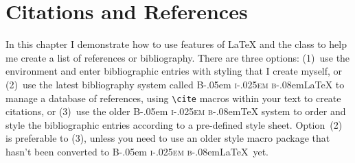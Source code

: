 
\def\BibTeX{{\rmfamily B\kern-.05em%
   \textsc{i\kern-.025em b}\kern-.08em\TeX}}
\def\BibLaTeX{{\rmfamily B\kern-.05em%
   \textsc{i\kern-.025em b}\kern-.08em\LaTeX}}


\newenvironment{narrowref}{
  \begin{singlespaced}
  \frenchspacing
  \setlength{\leftskip}{4em}
  \setlength{\rightskip}{3em}
  \setlength{\parindent}{-2em}
  \addvspace{0.5\baselineskip}
  \leavevmode
  \setlength{\parskip}{0.6\baselineskip}\ignorespaces}
 {\end{singlespaced}\addvspace{.5\baselineskip}}


\chapter{Citations and References}
In this chapter I demonstrate how to use features of \LaTeX{} and
the  class to help me create a list of references or
bibliography.  There are three options: (1)~use the 
environment and enter bibliographic entries with styling that I create
myself, or (2)~use the latest bibliography system called \BibLaTeX{}
to manage a database of references, using \verb|\cite| macros within
your text to create citations, or (3)~use the older \BibTeX{} system
to order and style the bibliographic entries according to a
pre-defined style sheet. Option~(2) is preferable to (3), unless you
need to use an older style macro package that hasn't been converted
to \BibLaTeX\ yet.

